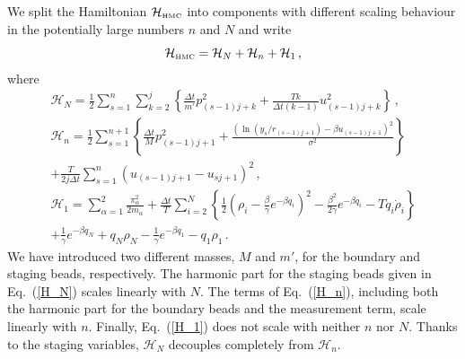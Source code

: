 \documentclass[12pt,a4paper,final]{iopart}
\begin{document}
We split the Hamiltonian $\mathcal{H}_{\mbox{\tiny HMC}}$ into components with different scaling behaviour in the potentially large numbers $n$ and $N$ and write
\begin{equation}
  \mathcal{H}_{\mbox{\tiny HMC}}= \mathcal H_N+\mathcal H_n+\mathcal H_1\,,
\end{equation}
where
\begin{eqnarray}
  \mathcal H_N =
  \frac{1}{2}
  \sum_{s=1}^{n}
  \sum_{k=2}^j
  \left\{
    \frac{\Delta t}{m'}p_{(s-1)j+k}^2
    +
    \frac{Tk}{\Delta t(k-1)}
    u_{(s-1)j+k}^2
  \right\}\,,\label{H_N}
  \\
  \mathcal H_n =
  \frac{1}{2}
  \sum_{s=1}^{n+1}
  \left\{
   \frac{\Delta t }{M}p_{(s-1)j+1}^2
    +
    \frac{(\ln(y_s/r_{(s-1)j+1}) - {\beta u_{(s-1)j+1}})^2}{\sigma^2}
   \right\} \nonumber
   \\
  +
  \frac{T}{2j\Delta t}
  \sum_{s=1}^{n}
    (u_{(s-1)j+1} - u_{sj+1})^2
   \,, \label{H_n} \\
  \mathcal H_1=
   \sum_{\alpha=1}^2\frac{\pi_\alpha^2}{2m_\alpha}
   +
  \frac{\Delta t}{T}
   \sum_{i=2}^{N}
   \left\{
    \frac{1}{2}
     \left(
        \rho_i-\frac{\beta}{\gamma}e^{-\beta q_i}
     \right)^2
    -
    \frac{\beta^2}{2\gamma}
    e^{-\beta q_i}
   -
    T q_i\dot\rho_i
   \right\} \nonumber
  \\
  +
  \frac{1}{\gamma}
  e^{-\beta q_N}
  +
  q_N \rho_{N}
  -
  \frac{1}{\gamma}
  e^{-\beta q_1}
  -
  q_1 \rho_{1} \,. \label{H_1}
\end{eqnarray}
We have introduced two different masses, $M$ and $m'$, for the boundary and staging beads, respectively. 
The harmonic part for the staging beads given in Eq.~(\ref{H_N}) scales linearly with $N$. The terms of Eq.~(\ref{H_n}), including both the harmonic part for the boundary beads and the measurement term, scale linearly with $n$. Finally, Eq.~(\ref{H_1}) does not scale with neither $n$ nor $N$.
Thanks to the staging variables, $\mathcal H_N$ decouples completely from $\mathcal H_n$.
\end{document}
